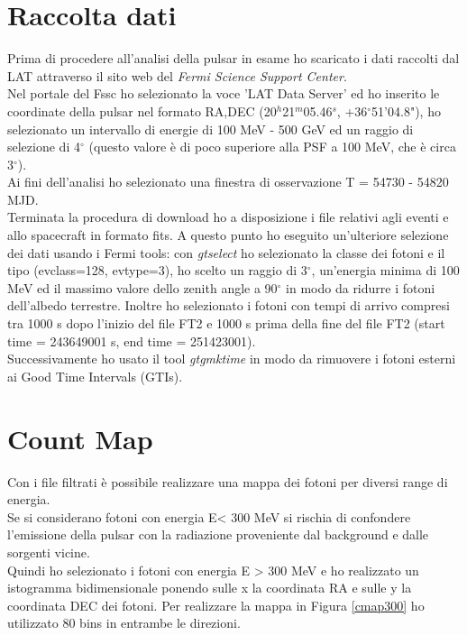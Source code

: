 \documentclass[a4paper,twocolumn]{article}
\begin{document}
\begin{large}

\section{Raccolta dati}
Prima di procedere all'analisi della pulsar in esame ho scaricato i dati raccolti dal LAT attraverso il sito web del \textit{Fermi Science Support Center}.\\
Nel portale del Fssc ho selezionato la voce 'LAT Data Server' ed ho inserito le coordinate della pulsar nel formato RA,DEC (20$^h$21$^m$05.46$^s$, +36$^\circ$51'04.8"), ho selezionato un intervallo di energie di 100 MeV - 500 GeV ed un raggio di selezione di 4$^{\circ}$ (questo valore è di poco superiore alla PSF a 100 MeV, che è circa 3$^{\circ}$).\\
Ai fini dell'analisi ho selezionato una finestra di osservazione T = 54730 - 54820 MJD.\\
Terminata la procedura di download ho a disposizione i file relativi agli eventi e allo spacecraft in formato fits.
A questo punto ho eseguito un'ulteriore selezione dei dati usando i Fermi tools: con \textit{gtselect} ho selezionato la classe dei fotoni e il tipo (evclass=128, evtype=3), ho scelto un raggio di 3$^{\circ}$, un'energia minima di 100 MeV ed il massimo valore dello zenith angle a 90$^{\circ}$ in modo da ridurre i fotoni dell'albedo terrestre. Inoltre ho selezionato i fotoni con tempi di arrivo compresi tra 1000 s dopo l'inizio del file FT2 e 1000 s prima della fine del file FT2 (start time = 243649001 s, end time = 251423001).\\
Successivamente ho usato il tool \textit{gtgmktime} in modo da rimuovere i fotoni esterni ai Good Time Intervals (GTIs).



\section{Count Map}
Con i file filtrati è possibile realizzare una mappa dei fotoni per diversi range di energia.\\
Se si considerano fotoni con energia E< 300 MeV si rischia di confondere l'emissione della pulsar con la radiazione proveniente dal background e dalle sorgenti vicine.\\
Quindi ho selezionato i fotoni con energia E > 300 MeV e ho realizzato un istogramma bidimensionale ponendo sulle x la coordinata RA e sulle y la coordinata DEC dei fotoni. Per realizzare la mappa in Figura \ref{cmap300} ho utilizzato 80 bins in entrambe le direzioni.



\end{large}
\end{document}
